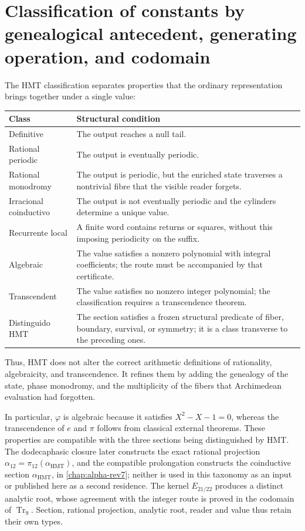 \section{Classification of constants by genealogical antecedent, generating operation, and codomain}

The HMT classification separates properties that the ordinary representation
brings together under a single value:
\begin{center}
\begin{tabular}{p{}p{}}
\toprule
Class & Structural condition \\
\midrule
Definitive & The output reaches a null tail. \\
Rational periodic & The output is eventually periodic. \\
Rational monodromy & The output is periodic, but the enriched state
traverses a nontrivial fibre that the visible reader forgets. \\
Irracional coinductivo & The output is not eventually periodic and the
cylinders determine a unique value. \\
Recurrente local & A finite word contains returns or squares, without this imposing periodicity on the suffix. \\
Algebraic & The value satisfies a nonzero polynomial with integral coefficients; the
route must be accompanied by that certificate. \\
Transcendent & The value satisfies no nonzero integer polynomial; the
classification requires a transcendence theorem. \\
Distinguido HMT & The section satisfies a frozen structural predicate of
fiber, boundary, survival, or symmetry; it is a class transverse to the
preceding ones. \\
\bottomrule
\end{tabular}
\end{center}

Thus, HMT does not alter the correct arithmetic definitions of rationality,
algebraicity, and transcendence. It refines them by adding the genealogy of the state,
phase monodromy, and the multiplicity of the fibers that Archimedean
evaluation had forgotten.

In particular, \(\varphi\) is algebraic because it satisfies
\(X^2-X-1=0\), whereas the transcendence of \(e\) and \(\pi\) follows from
classical external theorems. These properties are compatible with the three
sections being distinguished by HMT\@. The dodecaphasic closure later constructs
the exact rational projection
\(\alpha_{12}=\pi_{12}(\alpha_{\mathrm{HMT}})\), and the compatible prolongation
constructs the coinductive section \(\alpha_{\mathrm{HMT}}\), in
\cref{chap:alpha-rev7}; neither is used in this taxonomy as an input
or published here as a second residence. The kernel \(E_{21/22}\)
produces a distinct analytic root, whose agreement with the integer route is
proved in the codomain of \(\operatorname{Tr}_9\). Section, rational
projection, analytic root, reader and value thus retain their own types.

